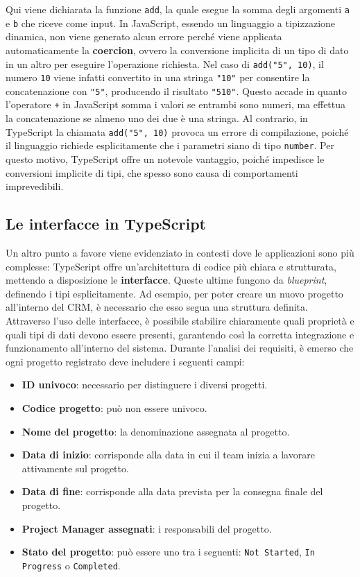 \documentclass[target=bach,aauheader=,style=]{thud}
\begin{document}
\noindent Qui viene dichiarata la funzione \texttt{add}, la quale esegue la somma degli argomenti \texttt{a} e \texttt{b} che riceve come input. In JavaScript, essendo un linguaggio a tipizzazione dinamica, non viene generato alcun errore perché viene applicata automaticamente la \textbf{coercion}, ovvero la conversione implicita di un tipo di dato in un altro per eseguire l'operazione richiesta. Nel caso di \texttt{add("5", 10)}, il numero \texttt{10} viene infatti convertito in una stringa \texttt{"10"} per consentire la concatenazione con \texttt{"5"}, producendo il risultato \texttt{"510"}. Questo accade in quanto l'operatore \texttt{+} in JavaScript somma i valori se entrambi sono numeri, ma effettua la concatenazione se almeno uno dei due è una stringa. Al contrario, in TypeScript la chiamata \texttt{add("5", 10)} provoca un errore di compilazione, poiché il linguaggio richiede esplicitamente che i parametri siano di tipo \texttt{number}. Per questo motivo, TypeScript offre un notevole vantaggio, poiché impedisce le conversioni implicite di tipi, che spesso sono causa di comportamenti imprevedibili.

\subsection{Le interfacce in TypeScript}
\noindent Un altro punto a favore viene evidenziato in contesti dove le applicazioni sono più complesse: TypeScript offre un'architettura di codice più chiara e strutturata, mettendo a disposizione le \textbf{interfacce}. Queste ultime fungono da \textit{blueprint}, definendo i tipi esplicitamente. Ad esempio, per poter creare un nuovo progetto all'interno del CRM, è necessario che esso segua una struttura definita. Attraverso l'uso delle interfacce, è possibile stabilire chiaramente quali proprietà e quali tipi di dati devono essere presenti, garantendo così la corretta integrazione e funzionamento all'interno del sistema. Durante l'analisi dei requisiti, è emerso che ogni progetto registrato deve includere i seguenti campi:

\begin{itemize}
    \item \textbf{ID univoco}: necessario per distinguere i diversi progetti.
    \item \textbf{Codice progetto}: può non essere univoco.
    \item \textbf{Nome del progetto}: la denominazione assegnata al progetto.
    \item \textbf{Data di inizio}: corrisponde alla data in cui il team inizia a lavorare attivamente sul progetto.
    \item \textbf{Data di fine}: corrisponde alla data prevista per la consegna finale del progetto.
    \item \textbf{Project Manager assegnati}: i responsabili del progetto.
    \item \textbf{Stato del progetto}: può essere uno tra i seguenti: \texttt{Not Started}, \texttt{In Progress} o \texttt{Completed}.
    
\end{itemize}
\end{document}
